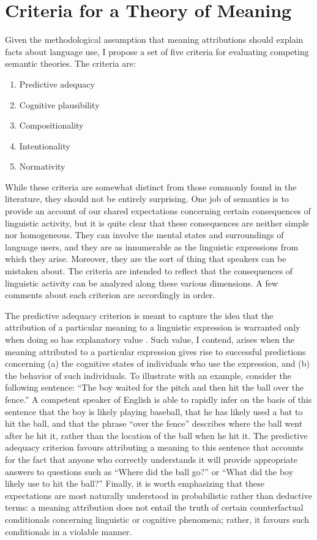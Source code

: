 \section{Criteria for a Theory of Meaning}

Given the methodological assumption that meaning attributions should explain facts about language use, I propose a set of five criteria for evaluating competing semantic theories. The criteria are:

\begin{enumerate}
  \item Predictive adequacy
  \item Cognitive plausibility
  \item Compositionality
  \item Intentionality
  \item Normativity
\end{enumerate}

\noindent
While these criteria are somewhat distinct from those commonly found in the literature, they should not be entirely surprising. One job of semantics is to provide an account of our shared expectations concerning certain consequences of linguistic activity, but it is quite clear that these consequences are neither simple nor homogeneous. They can involve the mental states and surroundings of language users, and they are as innumerable as the linguistic expressions from which they arise. Moreover, they are the sort of thing that speakers can be mistaken about. The criteria are intended to reflect that the consequences of linguistic activity can be analyzed along these various dimensions. A few comments about each criterion are accordingly in order.

The predictive adequacy criterion is meant to capture the idea that the attribution of a particular meaning to a linguistic expression is warranted only when doing so has explanatory value \citep[see][for related ideas]{Hochstein:2011,Dennett:1987}. Such value, I contend, arises when the meaning attributed to a particular expression gives rise to successful predictions concerning (a) the cognitive states of individuals who use the expression, and (b) the behavior of such individuals. To illustrate with an example, consider the following sentence: ``The boy waited for the pitch and then hit the ball over the fence.'' A competent speaker of English is able to rapidly infer on the basis of this sentence that the boy is likely playing baseball, that he has likely used a bat to hit the ball, and that the phrase ``over the fence'' describes where the ball went after he hit it, rather than the location of the ball when he hit it. The predictive adequacy criterion favours attributing a meaning to this sentence that accounts for the fact that anyone who correctly understands it will provide appropriate answers to questions such as ``Where did the ball go?'' or ``What did the boy likely use to hit the ball?'' Finally, it is worth emphasizing that these expectations are most naturally understood in probabilistic rather than deductive terms: a meaning attribution does not entail the truth of certain counterfactual conditionals concerning linguistic or cognitive phenomena; rather, it favours such conditionals in a violable manner.

